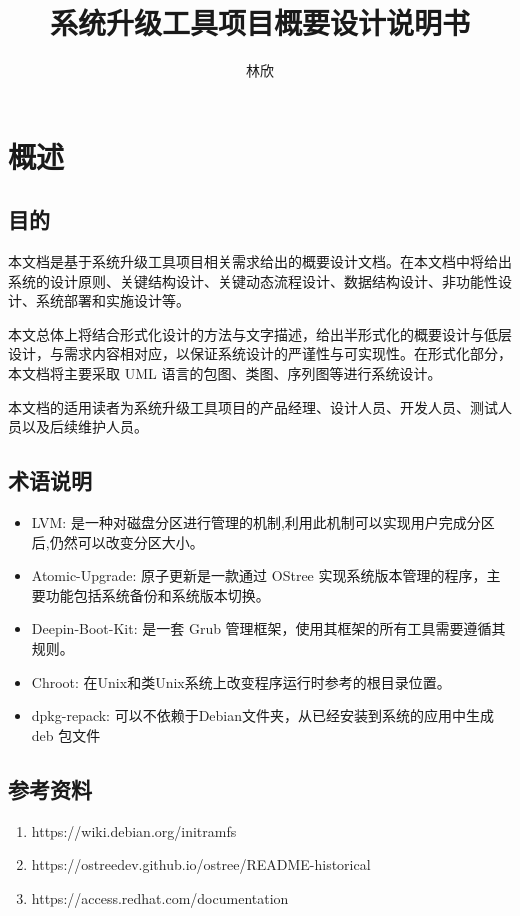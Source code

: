 \documentclass{utart}
\title{系统升级工具项目概要设计说明书}
\author{林欣}
\begin{document}


\graphicspath{ {./images/} }

\utMakeTOC

\newpage

\section{概述}
\subsection{目的}
本文档是基于系统升级工具项目相关需求给出的概要设计文档。在本文档中将给出系统的设计原则、关键结构设计、关键动态流程设计、数据结构设计、非功能性设计、系统部署和实施设计等。

本文总体上将结合形式化设计的方法与文字描述，给出半形式化的概要设计与低层设计，与需求内容相对应，以保证系统设计的严谨性与可实现性。在形式化部分，本文档将主要采取 UML 语言的包图、类图、序列图等进行系统设计。

本文档的适用读者为系统升级工具项目的产品经理、设计人员、开发人员、测试人员以及后续维护人员。

\subsection{术语说明}
\begin{itemize}
    \item LVM: 是一种对磁盘分区进行管理的机制,利用此机制可以实现用户完成分区后,仍然可以改变分区大小。
    \item Atomic-Upgrade: 原子更新是一款通过 OStree 实现系统版本管理的程序，主要功能包括系统备份和系统版本切换。
    \item Deepin-Boot-Kit: 是一套 Grub 管理框架，使用其框架的所有工具需要遵循其规则。
    \item Chroot: 在Unix和类Unix系统上改变程序运行时参考的根目录位置。
    \item dpkg-repack: 可以不依赖于Debian文件夹，从已经安装到系统的应用中生成 deb 包文件
\end{itemize}

\subsection{参考资料}
\begin{enumerate}
    \item https://wiki.debian.org/initramfs
    \item https://ostreedev.github.io/ostree/README-historical
    \item https://access.redhat.com/documentation
\end{enumerate}
\end{document}
